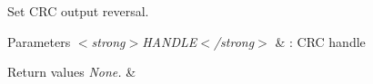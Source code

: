 Set C\+RC output reversal. 


\begin{DoxyParams}{Parameters}
{\em $<$strong$>$\+H\+A\+N\+D\+L\+E$<$/strong$>$} & \+: C\+RC handle \\
\hline
\end{DoxyParams}

\begin{DoxyRetVals}{Return values}
{\em None.} & \\
\hline
\end{DoxyRetVals}
